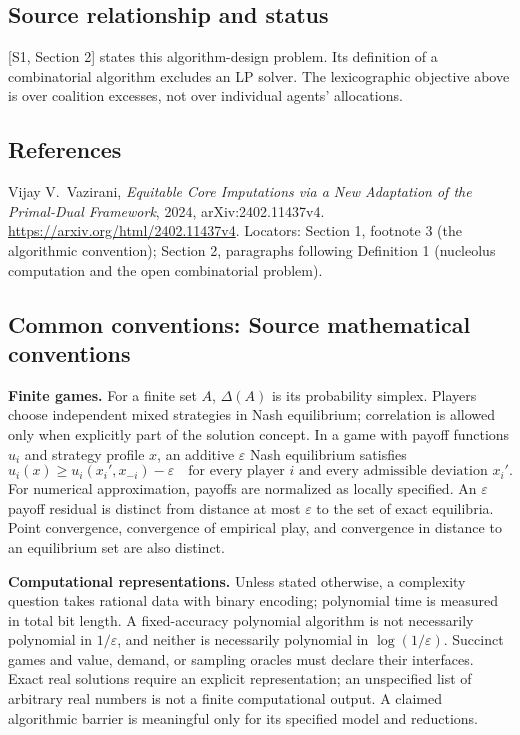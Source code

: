 \documentclass[11pt,a4paper]{article}
\begin{document}
\subsection*{Source relationship and status}
[S1, Section 2] states this algorithm-design problem.
Its definition of a combinatorial algorithm excludes an LP solver.
The lexicographic objective above is over coalition excesses, not
over individual agents' allocations.

\subsection*{References}
\begingroup\footnotesize\raggedright
\noindent[S1] Vijay V.~Vazirani,
\emph{Equitable Core Imputations via a New Adaptation of the
Primal-Dual Framework}, 2024, arXiv:2402.11437v4.
\url{https://arxiv.org/html/2402.11437v4}.
Locators: Section 1, footnote 3 (the algorithmic convention);
Section 2, paragraphs following Definition 1 (nucleolus computation
and the open combinatorial problem).
\par\endgroup

\subsection*{Common conventions: Source mathematical conventions}

\textbf{Finite games.} For a finite set $A$, $\Delta(A)$ is its probability
simplex. Players choose independent mixed strategies in Nash equilibrium;
correlation is allowed only when explicitly part of the solution concept.
In a game with payoff functions $u_i$ and strategy profile $x$, an additive
$\varepsilon$ Nash equilibrium satisfies
\[
 u_i(x)\geq u_i(x_i',x_{-i})-\varepsilon
 \quad\text{for every player $i$ and every admissible deviation $x_i'$}.
\]
For numerical approximation, payoffs are normalized as locally specified.
An $\varepsilon$ payoff residual is distinct from distance at most
$\varepsilon$ to the set of exact equilibria. Point convergence, convergence
of empirical play, and convergence in distance to an equilibrium set are
also distinct.

\textbf{Computational representations.} Unless stated otherwise, a complexity
question takes rational data with binary encoding; polynomial time is measured
in total bit length. A fixed-accuracy polynomial algorithm is not necessarily
polynomial in $1/\varepsilon$, and neither is necessarily polynomial in
$\log(1/\varepsilon)$. Succinct games and value, demand, or sampling oracles
must declare their interfaces. Exact real solutions require an explicit
representation; an unspecified list of arbitrary real numbers is not a
finite computational output. A claimed algorithmic barrier is meaningful
only for its specified model and reductions.
\end{document}

